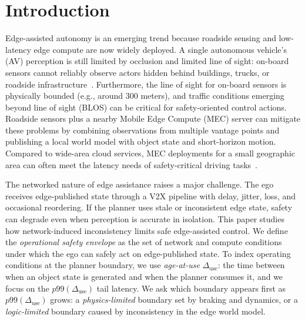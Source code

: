 \section{Introduction}

Edge-assisted autonomy is an emerging trend because roadside sensing and low-latency edge compute are now widely deployed. A single autonomous vehicle's (AV) perception is still limited by occlusion and limited line of sight: on-board sensors cannot reliably observe actors hidden behind buildings, trucks, or roadside infrastructure~\cite{tsukada_autoc2x_2020}. %
Furthermore, the line of sight for on-board sensors is physically bounded (e.g., around 300 meters), and traffic conditions emerging beyond line of sight (BLOS) can be critical for safety-oriented control actions. %
Roadside sensors plus a nearby Mobile Edge Compute (MEC) server can mitigate these problems %
by combining observations from multiple vantage points and publishing a local world model with object state and short-horizon motion. Compared to wide-area cloud services, MEC deployments for a small geographic area can often meet the latency needs of safety-critical driving tasks~\cite{edge_cloud_collab}.

The networked nature of edge assistance raises a major challenge.
The ego receives edge-published state through a V2X pipeline with delay, jitter, loss, and occasional reordering. If the planner uses stale or inconsistent edge state, safety can degrade even when perception is accurate in isolation. This paper studies how network-induced inconsistency limits safe edge-assisted control. We define the \emph{operational safety envelope} as the set of network and compute conditions under which the ego can safely act on edge-published state. To index operating conditions at the planner boundary, we use \emph{age-at-use} $\Delta_{\mathrm{use}}$: the time between when an object state is generated and when the planner consumes it, and we focus on the $p99(\Delta_{\mathrm{use}})$ tail latency. We ask which boundary appears first as $p99(\Delta_{\mathrm{use}})$ grows: a \emph{physics-limited} boundary set by braking and dynamics, or a \emph{logic-limited} boundary caused by inconsistency in the edge world model.

